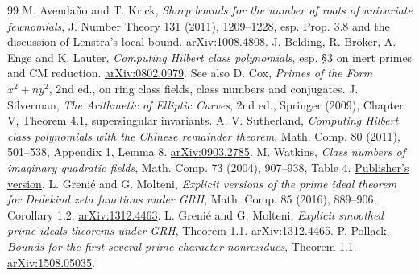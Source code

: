 \begin{thebibliography}{99}
 M. Avenda\~no and T. Krick, \emph{Sharp bounds for the number of roots of univariate fewnomials}, J. Number Theory 131 (2011), 1209--1228, esp. Prop. 3.8 and the discussion of Lenstra's local bound. \href{https://arxiv.org/abs/1008.4808}{arXiv:1008.4808}.
 J. Belding, R. Br\"oker, A. Enge and K. Lauter, \emph{Computing Hilbert class polynomials}, esp. \S3 on inert primes and CM reduction. \href{https://arxiv.org/abs/0802.0979}{arXiv:0802.0979}. See also D. Cox, \emph{Primes of the Form $x^2+ny^2$}, 2nd ed., on ring class fields, class numbers and conjugates.
 J. Silverman, \emph{The Arithmetic of Elliptic Curves}, 2nd ed., Springer (2009), Chapter V, Theorem 4.1, supersingular invariants.
 A. V. Sutherland, \emph{Computing Hilbert class polynomials with the Chinese remainder theorem}, Math. Comp. 80 (2011), 501--538, Appendix 1, Lemma 8. \href{https://arxiv.org/abs/0903.2785}{arXiv:0903.2785}.
 M. Watkins, \emph{Class numbers of imaginary quadratic fields}, Math. Comp. 73 (2004), 907--938, Table 4. \href{https://doi.org/10.1090/S0025-5718-03-01517-5}{Publisher's version}.
 L. Greni\'e and G. Molteni, \emph{Explicit versions of the prime ideal theorem for Dedekind zeta functions under GRH}, Math. Comp. 85 (2016), 889--906, Corollary 1.2. \href{https://arxiv.org/abs/1312.4463}{arXiv:1312.4463}.
 L. Greni\'e and G. Molteni, \emph{Explicit smoothed prime ideals theorems under GRH}, Theorem 1.1. \href{https://arxiv.org/abs/1312.4465}{arXiv:1312.4465}.
 P. Pollack, \emph{Bounds for the first several prime character nonresidues}, Theorem 1.1. \href{https://arxiv.org/abs/1508.05035}{arXiv:1508.05035}.
\end{thebibliography}
